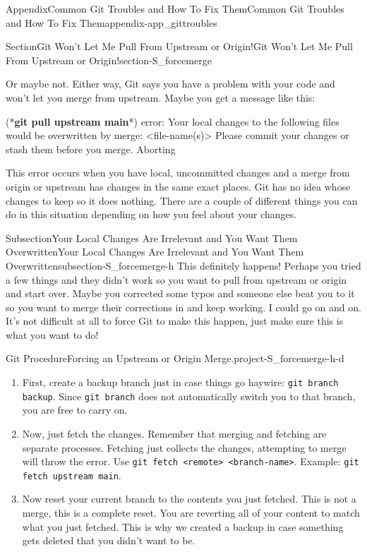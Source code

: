 \documentclass[oneside,10pt,]{book}
\newcommand{\mono}[1]{\texttt{#1}}
\newcommand{\consoleinput}[1]{\textbf{#1}}
\begin{document}
\begin{appendixptx}{Appendix}{Common Git Troubles and How To Fix Them}{}{Common Git Troubles and How To Fix Them}{}{}{appendix-app_gittroubles}
\begin{sectionptx}{Section}{Git Won't Let Me Pull From Upstream or Origin!}{}{Git Won't Let Me Pull From Upstream or Origin!}{}{}{section-S_forcemerge}
\begin{introduction}{}
\par
Or maybe not. Either way, Git says you have a problem with your code and won't let you merge from upstream. Maybe you get a message like this:%
\begin{console}{0}{1}{0}
(*\consoleinput{git pull upstream main}*)
error: Your local changes to the following files would be overwritten by merge:
        <file-name(s)>
Please commit your changes or stash them before you merge.
Aborting
\end{console}
This error occurs when you have local, uncommitted changes and a merge from origin or upstream has changes in the same exact places. Git has no idea whose changes to keep so it does nothing. There are a couple of different things you can do in this situation depending on how you feel about your changes.%
\end{introduction}%
%
%
\typeout{************************************************}
\typeout{************************************************}
%
\begin{subsectionptx}{Subsection}{Your Local Changes Are Irrelevant and You Want Them Overwritten}{}{Your Local Changes Are Irrelevant and You Want Them Overwritten}{}{}{subsection-S_forcemerge-h}
%
This definitely happens! Perhaps you tried a few things and they didn't work so you want to pull from upstream or origin and start over. Maybe you corrected some typos and someone else beat you to it so you want to merge their corrections in and keep working. I could go on and on. It's not difficult at all to force Git to make this happen, just make sure this is what you want to do!%
\begin{project}{Git Procedure}{Forcing an Upstream or Origin Merge.}{project-S_forcemerge-h-d}%
\begin{enumerate}[font=\bfseries,label=(\alph*),ref=\alph*]%
\item{}First, create a backup branch just in case things go haywire: \mono{git branch backup}. Since \mono{git branch} does not automatically switch you to that branch, you are free to carry on.%
\item{}Now, just fetch the changes. Remember that merging and fetching are separate processes. Fetching just collects the changes, attempting to merge will throw the error. Use \mono{git fetch <remote> <branch-name>}. Example: \mono{git fetch upstream main}.%
\item{}Now reset your current branch to the contents you just fetched. This is not a merge, this is a complete reset. You are reverting all of your content to match what you just fetched. This is why we created a backup in case something gets deleted that you didn't want to be.%

\end{enumerate}
\end{project}
\end{subsectionptx}
\end{sectionptx}
\end{appendixptx}
\end{document}
